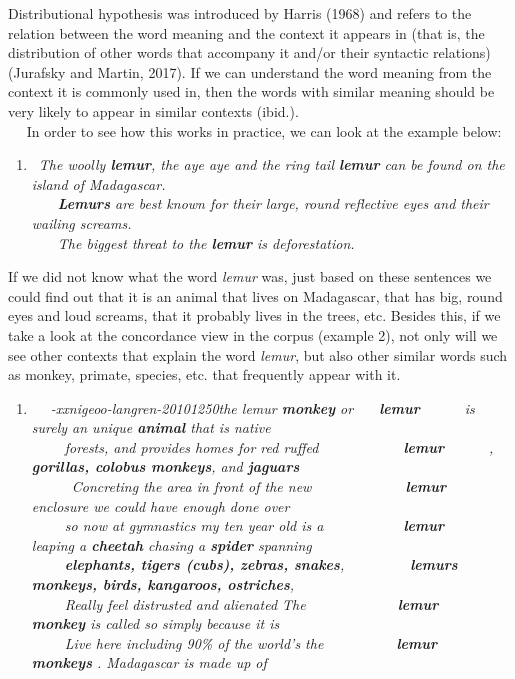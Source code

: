 \documentclass[11pt]{article}
\providecommand{\tightlist}{%
      \setlength{\itemsep}{0pt}\setlength{\parskip}{0pt}}
\begin{document}
Distributional hypothesis was introduced by Harris (1968) and refers to
the relation between the word meaning and the context it appears in
(that is, the distribution of other words that accompany it and/or their
syntactic relations) (Jurafsky and Martin, 2017). If we can understand
the word meaning from the context it is commonly used in, then the words
with similar meaning should be very likely to appear in similar contexts
(ibid.).\\
   In order to see how this works in practice, we can look at the
example below:

\begin{enumerate}
\def\labelenumi{(\arabic{enumi})}
\tightlist
\item
   \emph{The woolly \textbf{lemur}, the aye aye and the ring tail
  \textbf{lemur} can be found on the island of Madagascar.\\
      \textbf{Lemurs} are best known for their large, round reflective
  eyes and their wailing screams.\\
      The biggest threat to the \textbf{lemur} is deforestation.}
\end{enumerate}

If we did not know what the word \emph{lemur} was, just based on these
sentences we could find out that it is an animal that lives on
Madagascar, that has big, round eyes and loud screams, that it probably
lives in the trees, etc. Besides this, if we take a look at the
concordance view in the corpus (example 2), not only will we see other
contexts that explain the word \emph{lemur}, but also other similar
words such as monkey, primate, species, etc. that frequently appear with
it.

\begin{enumerate}
\def\labelenumi{(\arabic{enumi})}
\setcounter{enumi}{1}
\tightlist
\item
  \emph{   -xxnigeoo-langren-20101250the lemur \textbf{monkey} or
     \textbf{lemur}       is surely an unique \textbf{animal} that is
  native\\
       forests, and provides homes for red ruffed            
  \textbf{lemur}       , \textbf{gorillas, colobus monkeys}, and
  \textbf{jaguars}\\
        Concreting the area in front of the new             
  \textbf{lemur}       enclosure we could have enough done over\\
       so now at gymnastics my ten year old is a           
  \textbf{lemur}       leaping a \textbf{cheetah} chasing a
  \textbf{spider} spanning\\
       \textbf{elephants, tigers (cubs), zebras, snakes},         
  \textbf{lemurs}      \textbf{monkeys, birds, kangaroos, ostriches},\\
       Really feel distrusted and alienated The             
  \textbf{lemur}       \textbf{monkey} is called so simply because it
  is\\
       Live here including 90\% of the world's the          
  \textbf{lemur}       \textbf{monkeys} . Madagascar is made up of}
\end{enumerate}
\end{document}

